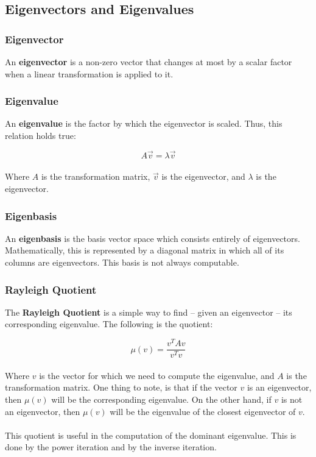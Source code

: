 \documentclass{article}
\begin{document}
\subsection{Eigenvectors and Eigenvalues}
\subsubsection{Eigenvector}
An \textbf{eigenvector} is a non-zero vector that changes at most by a scalar factor when a linear transformation is applied to it. 

\subsubsection{Eigenvalue}
An \textbf{eigenvalue} is the factor by which the eigenvector is scaled. Thus, this relation holds true:

\[ A\overrightarrow{v} = \lambda\overrightarrow{v} \] \\
Where $A$ is the transformation matrix, $\overrightarrow{v}$ is the eigenvector, and $\lambda$ is the eigenvector.

\subsubsection{Eigenbasis}
An \textbf{eigenbasis} is the basis vector space which consists entirely of eigenvectors. Mathematically, this is represented by a diagonal matrix in which all of its columns are eigenvectors. This basis is not always computable.

\subsubsection{Rayleigh Quotient}
The \textbf{Rayleigh Quotient} is a simple way to find -- given an eigenvector -- its corresponding eigenvalue. The following is the quotient:

\[ \mu(v) = \frac{v^T A v}{v^T v} \] \\
Where $v$ is the vector for which we need to compute the eigenvalue, and $A$ is the transformation matrix. One thing to note, is that if the vector $v$ is an eigenvector, then $\mu(v)$ will be the corresponding eigenvalue. On the other hand, if $v$ is not an eigenvector, then $\mu(v)$ will be the eigenvalue of the closest eigenvector of $v$. \\ \\
This quotient is useful in the computation of the dominant eigenvalue. This is done by the power iteration and by the inverse iteration.
\end{document}
